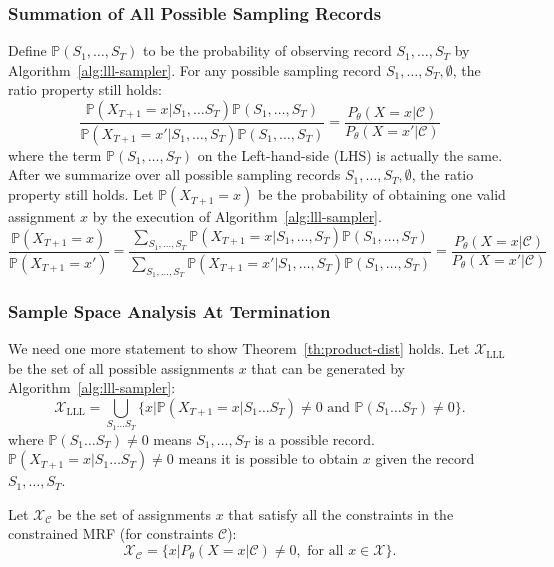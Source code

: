 \documentclass[letterpaper]{article} %
\newcommand{\p}{\mathbb{P}}
\begin{document}
\subsubsection{Summation of All Possible Sampling Records} Define $\p(S_1,\ldots,S_T)$ to be the probability of observing record $S_1,\ldots,S_T$ by Algorithm~\ref{alg:lll-sampler}.
For any possible sampling record $S_1,\ldots,S_{T}, \emptyset$, the ratio property still holds:
\begin{equation*}
\frac{\p(X_{T+1}=x|S_1,\ldots S_T)\p(S_1,\ldots,S_T)}{\p(X_{T+1}=x'|S_1,\ldots,S_T)\p(S_1,\ldots,S_T)}=\frac{P_{\theta}(X=x|\mathcal{C})}{P_{\theta}(X=x'|\mathcal{C})}
\end{equation*}
where the term $\p(S_1,\ldots,S_T)$ on the Left-hand-side (LHS) is actually the same.
After we summarize over all possible sampling records $S_1,\ldots,S_{T},\emptyset$, the ratio property still holds. Let $\p(X_{T+1}=x)$ be the probability of obtaining one valid assignment $x$ by the execution of Algorithm~\ref{alg:lll-sampler}.
\begin{equation} \label{eq:ratio-final}
\frac{\p(X_{T+1}=x)}{\p(X_{T+1}=x')}=\frac{\sum_{S_1,\ldots,S_T}\p(X_{T+1}=x|S_1,\ldots,S_T)\p(S_1,\ldots,S_T)}{\sum_{S_1,\ldots,S_T}\p(X_{T+1}=x'|S_1,\ldots,S_T)\p(S_1,\ldots,S_T)}=\frac{P_{\theta}(X=x|\mathcal{C})}{P_{\theta}(X=x'|\mathcal{C})}
\end{equation}

\subsubsection{Sample Space Analysis At Termination}
We need one more statement to show Theorem~\ref{th:product-dist} holds. Let $\mathcal{X}_{\text{LLL}}$ be the set of all possible  assignments $x$ that can be generated by Algorithm~\ref{alg:lll-sampler}:
\begin{equation*}
\mathcal{X}_{\text{LLL}}=\bigcup_{S_1\ldots S_T}\{x|\p(X_{T+1}=x|S_1\ldots S_T) \neq 0 \text{ and } \p(S_1\ldots S_T)\neq 0\}.
\end{equation*}
{where $ \p(S_1\ldots S_T)\neq 0$ means $S_1,\ldots,S_T$ is a possible record. $\p(X_{T+1}=x|S_1\ldots S_T) \neq 0$ means it is possible to obtain $x$ given the record $S_1,\ldots,S_T$.}

Let $\mathcal{X}_{\mathcal{C}}$ be the set of assignments $x$ that satisfy all the constraints in the constrained MRF (for constraints $\mathcal{C}$):
\begin{equation*}
\mathcal{X}_{\mathcal{C}}=\{x|P_{\theta}(X=x|\mathcal{C}) \neq 0, \text{ for all }x\in\mathcal{X}\}.
\end{equation*}
\end{document}
